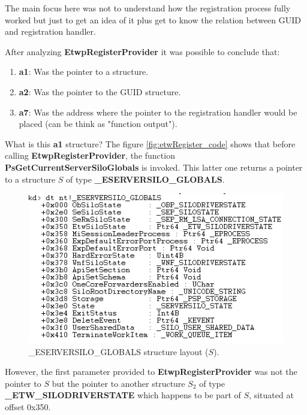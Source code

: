   The main focus here was not to understand how the registration process fully worked but just to get an idea of it plus get to know the relation between GUID and registration handler.

  After analyzing  {\bfseries EtwpRegisterProvider} it was possible to conclude that:
  \begin{enumerate}
\setlength\itemsep{0.05em}
  \item {\bfseries a1}: Was the pointer to a structure.
  \item {\bfseries a2}: Was the pointer to the GUID structure. 
  \item {\bfseries a7}: Was the address where the pointer to the registration handler would be placed (can be think as "function output").
  \end{enumerate}

  What is this {\bfseries a1} structure?
  The figure \ref{fig:etwRegister_code} shows that before calling {\bfseries EtwpRegisterProvider}, the function {\bfseries PsGetCurrentServerSiloGlobals} is invoked. This latter one returns a pointer to a structure $S$ of type {\bfseries \_ESERVERSILO\_GLOBALS}. 

  \begin{centering}
  \begin{figure}[H]
    \includegraphics[width=12cm]{images/ESILOGLOBALS_structure.png}
    \caption[]{\_ESERVERSILO\_GLOBALS structure layout ($S$).}
    \label{fig:eserversilo_globals_structure}
  \end{figure}
  \end{centering}

  However, the first parameter provided to {\bfseries EtwpRegisterProvider} was not the pointer to $S$ but the pointer to another structure $S_2$ of type {\bfseries \_ETW\_SILODRIVERSTATE} which happens to be part of $S$, situated at offset 0x350. 

